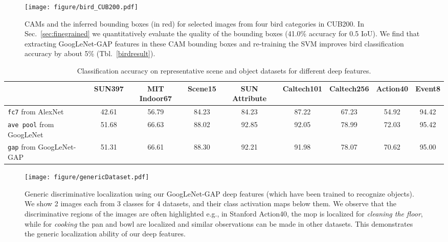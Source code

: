 \documentclass[10pt,twocolumn,letterpaper]{article}
\begin{document}
\begin{figure}
\begin{center}
\texttt{[image: figure/bird\_CUB200.pdf]}
\end{center}
\caption{CAMs and the inferred bounding boxes (in red) for selected images from four bird categories in CUB200. In Sec.~\ref{sec:finegrained} we quantitatively evaluate the quality of the bounding boxes (41.0\% accuracy for 0.5 IoU). We find that extracting GoogLeNet-GAP features in these CAM bounding boxes and re-training the SVM improves bird classification accuracy by about 5\% (Tbl.~\ref{birdresult}).}
\label{fig:bird}
\end{figure}


\begin{table*}\caption{Classification accuracy on representative scene and object datasets for different deep features. }\label{dataset_comparison}
\centering
\footnotesize
\begin{tabular}{lcccccccc}
\hline
\hline
 &SUN397&MIT Indoor67&Scene15&SUN Attribute&Caltech101&Caltech256&Action40 & Event8 \\
\hline
\texttt{fc7} from AlexNet       & 42.61 & 56.79 & 84.23 & 84.23 & 87.22 & 67.23 & 54.92 & 94.42 \\
\texttt{ave pool} from GoogLeNet     & 51.68 & 66.63 & 88.02 & 92.85 & 92.05  & 78.99    & 72.03 & 95.42\\
\texttt{gap} from GoogLeNet-GAP  & 51.31 & 66.61 & 88.30 & 92.21 & 91.98  & 78.07    & 70.62 & 95.00\\
\hline
\end{tabular}
\label{tableResultsDeepSceneFeat}
\end{table*}

\begin{figure*}
\begin{center}
\texttt{[image: figure/genericDataset.pdf]}
\end{center}
\vspace*{-4mm}
\caption{Generic discriminative localization using our GoogLeNet-GAP deep features (which have been trained to recognize objects). We show 2 images each from 3 classes for 4 datasets, and their class activation maps below them. We observe that the discriminative regions of the images are often highlighted e.g., in Stanford Action40, the mop is localized for \textit{cleaning the floor}, while for \textit{cooking} the pan and bowl are localized and similar observations can be made in other datasets. This demonstrates the generic localization ability of our deep features.}
\label{fig:genericlocalization}
\end{figure*}
\end{document}
